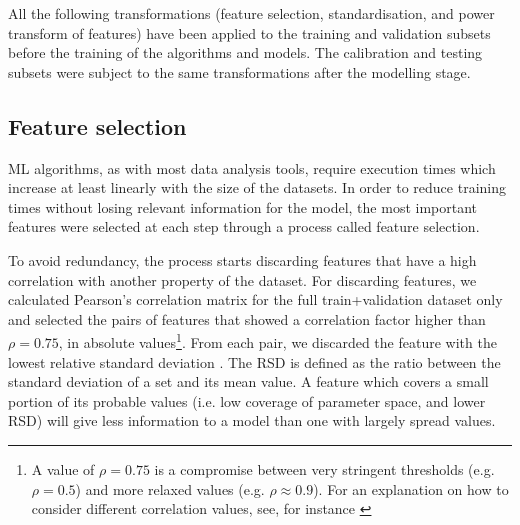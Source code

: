 \documentclass{aa}
\begin{document}
All the following transformations (feature selection, standardisation, and power transform of features) have been applied to the training and validation subsets before the training of the algorithms and models. 
The calibration and testing subsets were subject to the same transformations after the modelling stage.

\subsection{Feature selection}\label{sec:feat_selection}

ML algorithms, as with most data analysis tools, require execution times which increase at least linearly with the size of the datasets. In order to reduce training times without losing relevant information for the model, the most important features were selected at each step through a process called feature selection. 

To avoid redundancy, the process starts discarding features that have a high correlation with another property of the dataset. For discarding features, we calculated Pearson's correlation matrix for the full train+validation dataset only and selected the pairs of features that showed a correlation factor higher than $\rho = 0.75$, in absolute values\footnote{A value of $\rho = 0.75$ is a compromise between very stringent thresholds (e.g. $\rho = 0.5$) and more relaxed values (e.g. $\rho \approx 0.9$). For an explanation on how to consider different correlation values, see, for instance \citet{Ratner2009}}. From each pair, we discarded the feature with the lowest relative standard deviation \citep[RSD;][]{johnson1964statistics}. The RSD is defined as the ratio between the standard deviation of a set and its mean value. A feature which covers a small portion of its probable values (i.e. low coverage of parameter space, and lower RSD) will give less information to a model than one with largely spread values.

\end{document}
